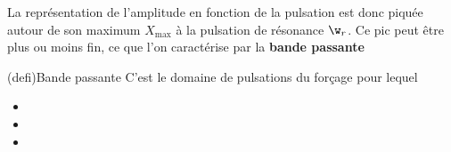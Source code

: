 \documentclass[../../main/main.tex]{subfiles}
\begin{document}
La représentation de l'amplitude en fonction de la pulsation est donc piquée
autour de son maximum $X_{\max}$ à la pulsation de résonance $\w_r$. Ce pic peut
être plus ou moins fin, ce que l'on caractérise par la \textbf{bande passante}
\begin{tcb}[sidebyside, righthand ratio=.4](defi){Bande passante}
	C'est le domaine de pulsations du forçage pour lequel
	\vspace{-15pt}
	\begin{itemize}
		\item {}
		\item {}
		\item {}
	\end{itemize}
	\tcblower
	\begin{center}
		\vspace{-15pt}
	\end{center}
\end{tcb}
\end{document}
